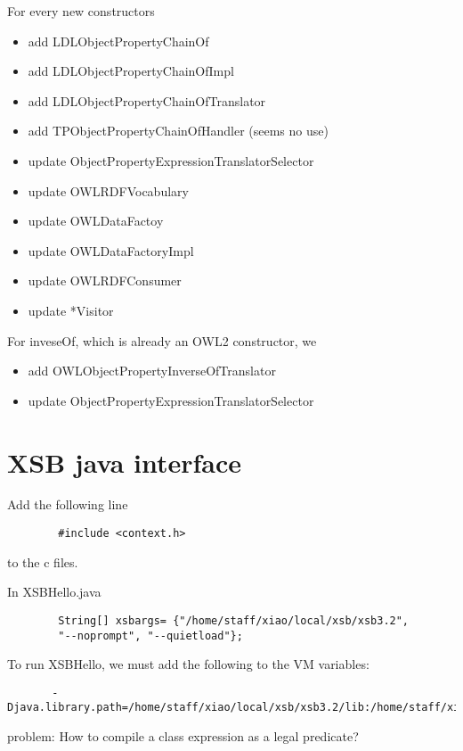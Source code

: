 \documentclass{article}
\begin{document}
	For every new constructors
	
	\begin{itemize}
      \item add LDLObjectPropertyChainOf
      \item add LDLObjectPropertyChainOfImpl
      \item add LDLObjectPropertyChainOfTranslator 
      \item add TPObjectPropertyChainOfHandler (seems no use)
      \item update ObjectPropertyExpressionTranslatorSelector
      \item update OWLRDFVocabulary
      \item update OWLDataFactoy
      \item update OWLDataFactoryImpl
      \item update OWLRDFConsumer      
      \item update *Visitor
    \end{itemize}
	
	For inveseOf, which is already an OWL2 constructor, we 	
	\begin{itemize}
      \item add OWLObjectPropertyInverseOfTranslator
      \item update ObjectPropertyExpressionTranslatorSelector
    \end{itemize}
	
	
	\section{XSB java interface}
	
	
	Add the following line
	\begin{verbatim}
		#include <context.h>
	\end{verbatim}
	to the c files.
	
	In XSBHello.java
	\begin{verbatim}
    	String[] xsbargs= {"/home/staff/xiao/local/xsb/xsb3.2", 
    	"--noprompt", "--quietload"};
    \end{verbatim}
	
	To run XSBHello, we must add the following to the VM variables:
	\begin{verbatim}
       -Djava.library.path=/home/staff/xiao/local/xsb/xsb3.2/lib:/home/staff/xiao/local/xsb
    \end{verbatim}
	
	problem: How to compile a class expression as a legal predicate?
	
	
\end{document}
